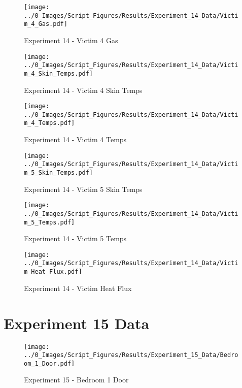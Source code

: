 	\begin{figure}[H]
		\centering
		\texttt{[image: ../0\_Images/Script\_Figures/Results/Experiment\_14\_Data/Victim\_4\_Gas.pdf]}
		\caption[]{Experiment 14 - Victim 4 Gas}
	\end{figure}
 
	\clearpage

	\begin{figure}[H]
		\centering
		\texttt{[image: ../0\_Images/Script\_Figures/Results/Experiment\_14\_Data/Victim\_4\_Skin\_Temps.pdf]}
		\caption[]{Experiment 14 - Victim 4 Skin Temps}
	\end{figure}
 

	\begin{figure}[H]
		\centering
		\texttt{[image: ../0\_Images/Script\_Figures/Results/Experiment\_14\_Data/Victim\_4\_Temps.pdf]}
		\caption[]{Experiment 14 - Victim 4 Temps}
	\end{figure}
 
	\clearpage

	\begin{figure}[H]
		\centering
		\texttt{[image: ../0\_Images/Script\_Figures/Results/Experiment\_14\_Data/Victim\_5\_Skin\_Temps.pdf]}
		\caption[]{Experiment 14 - Victim 5 Skin Temps}
	\end{figure}
 

	\begin{figure}[H]
		\centering
		\texttt{[image: ../0\_Images/Script\_Figures/Results/Experiment\_14\_Data/Victim\_5\_Temps.pdf]}
		\caption[]{Experiment 14 - Victim 5 Temps}
	\end{figure}
 
	\clearpage

	\begin{figure}[H]
		\centering
		\texttt{[image: ../0\_Images/Script\_Figures/Results/Experiment\_14\_Data/Victim\_Heat\_Flux.pdf]}
		\caption[]{Experiment 14 - Victim Heat Flux}
	\end{figure}
 

\clearpage		\large
\section{Experiment 15 Data} \label{App:Exp15Results} 

	\begin{figure}[H]
		\centering
		\texttt{[image: ../0\_Images/Script\_Figures/Results/Experiment\_15\_Data/Bedroom\_1\_Door.pdf]}
		\caption[]{Experiment 15 - Bedroom 1 Door}
	\end{figure}
 

